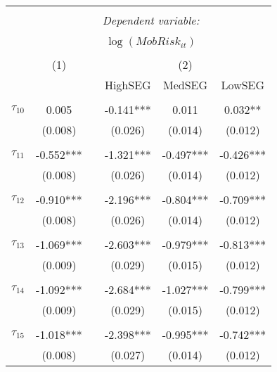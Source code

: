 \begin{tabular}{@{\extracolsep{-5pt}}lccccc} 
\\[-1.8ex]\hline 
\hline \\[-1.8ex] 
 & \multicolumn{5}{c}{\textit{Dependent variable:}} \\ 
\cline{2-6} 
\\[-1.8ex] & \multicolumn{5}{c}{$\log(MobRisk_{it})$}\\ 
\\[-1.8ex] & (1) && \multicolumn{3}{c}{(2)} \\ 
\cline{2-2}\cline{4-6}
        &&& HighSEG & MedSEG & LowSEG  \\
 \\[-1.8ex] 
$\tau_{10}$     &   0.005   && -0.141*** &   0.011   &  0.032**  \\
                &  (0.008)  &&  (0.026)  &  (0.014)  &  (0.012)  \\
                &           &&           &           &           \\[-2.1ex]
$\tau_{11}$     & -0.552*** && -1.321*** & -0.497*** & -0.426*** \\
                &  (0.008)  &&  (0.026)  &  (0.014)  &  (0.012)  \\
                &           &&           &           &           \\[-2.1ex]
$\tau_{12}$     & -0.910*** && -2.196*** & -0.804*** & -0.709*** \\
                &  (0.008)  &&  (0.026)  &  (0.014)  &  (0.012)  \\
                &           &&           &           &           \\[-2.1ex]
$\tau_{13}$     & -1.069*** && -2.603*** & -0.979*** & -0.813*** \\
                &  (0.009)  &&  (0.029)  &  (0.015)  &  (0.012)  \\
                &           &&           &           &           \\[-2.1ex]
$\tau_{14}$     & -1.092*** && -2.684*** & -1.027*** & -0.799*** \\
                &  (0.009)  &&  (0.029)  &  (0.015)  &  (0.012)  \\
                &           &&           &           &           \\[-2.1ex]
$\tau_{15}$     & -1.018*** && -2.398*** & -0.995*** & -0.742*** \\
                &  (0.008)  &&  (0.027)  &  (0.014)  &  (0.012)  \\

\end{tabular}
